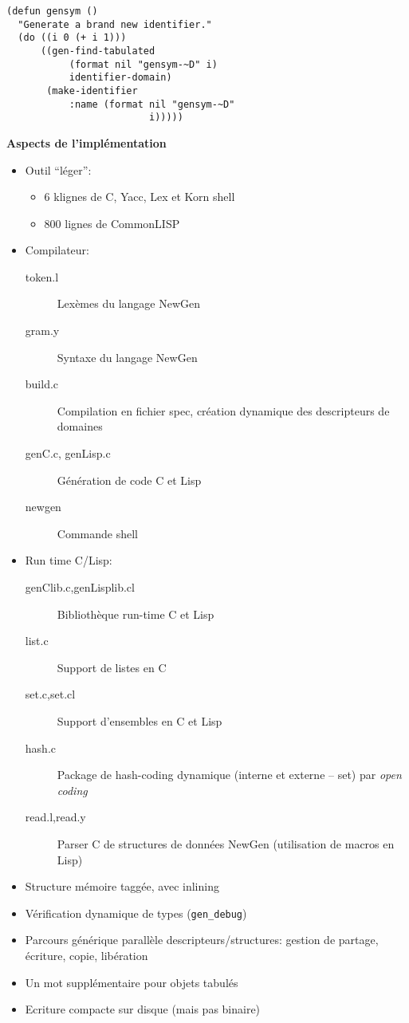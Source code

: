 \documentclass[11pt]{article}
\newcommand{\newgen}{NewGen}
\begin{document}
{\newpage

\vskip 2cm

\begin{verbatim}
(defun gensym () 
  "Generate a brand new identifier."
  (do ((i 0 (+ i 1))) 
      ((gen-find-tabulated 
           (format nil "gensym-~D" i)
           identifier-domain)
       (make-identifier 
           :name (format nil "gensym-~D"
                         i)))))
\end{verbatim}

\newpage

\begin{center}
{\huge\bf Aspects de l'implémentation}
\end{center}

\vskip 2cm

\begin{itemize}
\item Outil ``léger'': 
  \begin{itemize}
  \item 6 klignes de C, Yacc{}, Lex et Korn shell
  \item 800 lignes de CommonLISP
  \end{itemize}
\item Compilateur:
  \begin{description}
  \item[token.l] Lexèmes du langage \newgen
  \item[gram.y] Syntaxe du langage \newgen
  \item[build.c] Compilation en fichier spec{}, création dynamique des
descripteurs de domaines
  \item[genC.c{}, genLisp.c] Génération de code C et Lisp
  \item[newgen] Commande shell
  \end{description}
\item Run time C/Lisp:
  \begin{description}
  \item[genClib.c{},genLisplib.cl] Bibliothèque run-time C et Lisp
  \item[list.c] Support de listes en C
  \item[set.c{},set.cl] Support d'ensembles en C et Lisp
  \item[hash.c] Package de hash-coding dynamique (interne et externe --
set) par {\em open coding}
  \item[read.l,read.y] Parser C de structures de données \newgen 
(utilisation de macros en Lisp)
  \end{description}
\item Structure mémoire taggée, avec inlining
\item Vérification dynamique de types ({\tt gen\_debug})
\item Parcours générique parallèle descripteurs/structures:
gestion de partage, écriture, copie, libération
\item Un mot supplémentaire pour objets tabulés 
\item Ecriture compacte sur disque (mais pas binaire)
\end{itemize}

}
\end{document}
